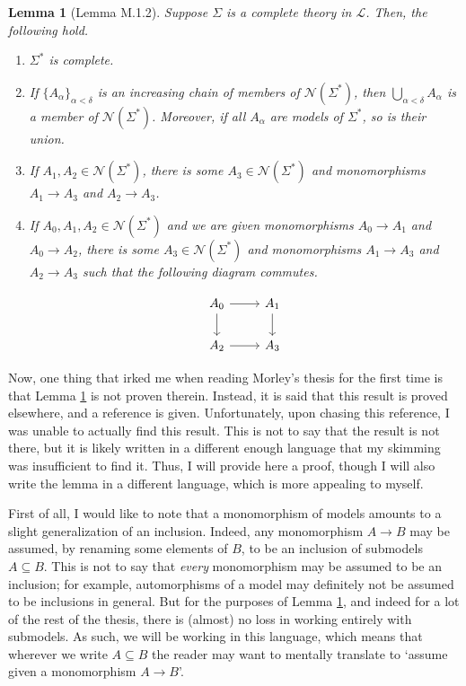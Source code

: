 \documentclass{article}
\newtheorem{lemma}[theorem]{Lemma}
\theoremstyle{nonumberplain}
\newcommand{\Lang}{\mathcal{L}}
\newcommand{\calN}{\mathcal{N}}
\begin{document}
\begin{lemma}[Lemma M.1.2]\label{lem:1.2}
Suppose $\Sigma$ is a complete theory in $\Lang$. Then, the following hold.
\begin{enumerate}
\item\label{item:1.2:1} $\Sigma^*$ is complete.
\item\label{item:1.2:2} If $\{A_\alpha\}_{\alpha < \delta}$ is an increasing chain of members of $\calN(\Sigma^*)$, then $\bigcup_{\alpha < \delta} A_\alpha$ is a member of $\calN(\Sigma^*)$. Moreover, if all $A_\alpha$ are models of $\Sigma^*$, so is their union.
\item\label{item:1.2:3} If $A_1, A_2 \in \calN(\Sigma^*)$, there is some $A_3 \in \calN(\Sigma^*)$ and monomorphisms $A_1 \to A_3$ and $A_2 \to A_3$.
\item\label{item:1.2:4} If $A_0, A_1, A_2 \in \calN(\Sigma^*)$ and we are given monomorphisms $A_0 \to A_1$ and $A_0 \to A_2$, there is some $A_3 \in \calN(\Sigma^*)$ and monomorphisms $A_1 \to A_3$ and $A_2 \to A_3$ such that the following diagram commutes.

\begin{equation}
\begin{tikzcd}
A_0 \arrow[r] \arrow[d] & A_1 \arrow[d] \\
A_2 \arrow[r]           & A_3          
\end{tikzcd}
\end{equation}
\end{enumerate}
\end{lemma}

Now, one thing that irked me when reading Morley's thesis for the first time is that Lemma \ref{lem:1.2} is not proven therein. Instead, it is said that this result is proved elsewhere, and a reference is given. Unfortunately, upon chasing this reference, I was unable to actually find this result. This is not to say that the result is not there, but it is likely written in a different enough language that my skimming was insufficient to find it. Thus, I will provide here a proof, though I will also write the lemma in a different language, which is more appealing to myself.

First of all, I would like to note that a monomorphism of models amounts to a slight generalization of an inclusion. Indeed, any monomorphism $A \to B$ may be assumed, by renaming some elements of $B$, to be an inclusion of submodels $A \subseteq B$. This is not to say that \emph{every} monomorphism may be assumed to be an inclusion; for example, automorphisms of a model may definitely not be assumed to be inclusions in general. But for the purposes of Lemma \ref{lem:1.2}, and indeed for a lot of the rest of the thesis, there is (almost) no loss in working entirely with submodels. As such, we will be working in this language, which means that wherever we write $A \subseteq B$ the reader may want to mentally translate to `assume given a monomorphism $A \to B$'.
\end{document}
